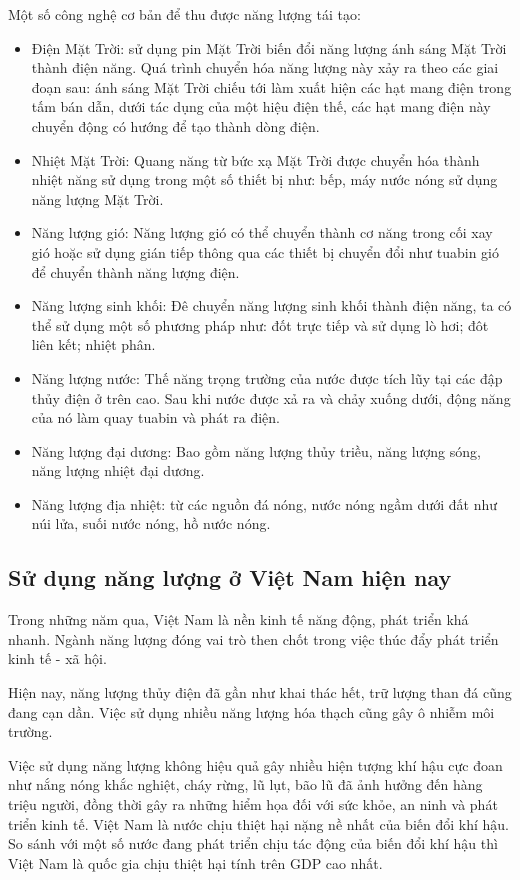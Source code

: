 Một số công nghệ cơ bản để thu được năng lượng tái tạo:
\begin{itemize}
	\item Điện Mặt Trời: sử dụng pin Mặt Trời biến đổi năng lượng ánh sáng Mặt Trời thành điện năng. Quá trình chuyển hóa năng lượng này xảy ra theo các giai đoạn sau: ánh sáng Mặt Trời chiếu tới làm xuất hiện các hạt mang điện trong tấm bán dẫn, dưới tác dụng của một hiệu điện thế, các hạt mang điện này chuyển động có hướng để tạo thành dòng điện.
	\item Nhiệt Mặt Trời: Quang năng từ bức xạ Mặt Trời được chuyển hóa thành nhiệt năng sử dụng trong một số thiết bị như: bếp, máy nước nóng sử dụng năng lượng Mặt Trời.
	\item Năng lượng gió: Năng lượng gió có thể chuyển thành cơ năng trong cối xay gió hoặc sử dụng gián tiếp thông qua các thiết bị chuyển đổi như tuabin gió để chuyển thành năng lượng điện.
	\item Năng lượng sinh khối: Đê chuyển năng lượng sinh khối thành điện năng, ta có thể sử dụng một số phương pháp như: đốt trực tiếp và sử dụng lò hơi; đôt liên kết; nhiệt phân.
	\item Năng lượng nước: Thế năng trọng trường của nước được tích lũy tại các đập thủy điện ở trên cao. Sau khi nước được xả ra và chảy xuống dưới, động năng của nó làm quay tuabin và phát ra điện.
	\item Năng lượng đại dương: Bao gồm năng lượng thủy triều, năng lượng sóng, năng lượng nhiệt đại dương.
	\item Năng lượng địa nhiệt: từ các nguồn đá nóng, nước nóng ngầm dưới đất như núi lửa, suối nước nóng, hồ nước nóng.
\end{itemize}
\subsection{Sử dụng năng lượng ở Việt Nam hiện nay}
Trong những năm qua, Việt Nam là nền kinh tế năng động, phát triển khá nhanh. Ngành năng lượng đóng vai trò then chốt trong việc thúc đẩy phát triển kinh tế - xã hội.

Hiện nay, năng lượng thủy điện đã gần như khai thác hết, trữ lượng than đá cũng đang cạn dần. Việc sử dụng nhiều năng lượng hóa thạch cũng gây ô nhiễm môi trường.

Việc sử dụng năng lượng không hiệu quả gây nhiều hiện tượng khí hậu cực đoan như nắng nóng khắc nghiệt, cháy rừng, lũ lụt, bão lũ đã ảnh hưởng đến hàng triệu người, đồng thời gây ra những hiểm họa đối với sức khỏe, an ninh và phát triển kinh tế. Việt Nam là nước chịu thiệt hại nặng nề nhất của biến đổi khí hậu. So sánh với một số nước đang phát triển chịu tác động của biến đổi khí hậu thì Việt Nam là quốc gia chịu thiệt hại tính trên GDP cao nhất.


